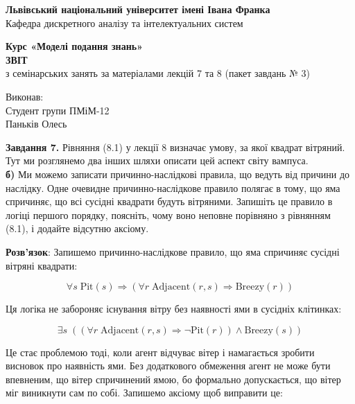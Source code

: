 \documentclass[a4paper,14pt]{extarticle} %
\begin{document}
\thispagestyle{empty}

\begin{center}
    \textbf{Львівський національний університет імені Івана Франка}\\[1ex]
    Кафедра дискретного аналізу та інтелектуальних систем
\end{center}

\vspace{5cm} %

\begin{center}
    \Large\textbf{Курс «Моделі подання знань»}\\[4ex]
    \huge\textbf{ЗВІТ}\\[3ex]
    \Large з семінарських занять за матеріалами лекцій 7 та 8 (пакет завдань № 3)
\end{center}

\vspace{2cm}
\begin{flushright}
    Виконав:\\
    Студент групи ПМіМ-12\\
    Паньків Олесь
\end{flushright}


\newpage
\pagestyle{plain}

\textbf{Завдання 7.} Рівняння (8.1) у лекції 8 визначає умову, за якої квадрат вітряний. Тут ми
розглянемо два інших шляхи описати цей аспект світу вампуса.\\
\textbf{б)} Ми можемо записати причинно-наслідкові правила, що ведуть від причини до наслідку.
Одне очевидне причинно-наслідкове правило полягає в тому, що яма спричиняє, що всі
сусідні квадрати будуть вітряними. Запишіть це правило в логіці першого порядку, поясніть,
чому воно неповне порівняно з рівнянням (8.1), і додайте відсутню аксіому.

\textbf{Розв'язок}: Запишемо причинно-наслідкове правило, що яма спричиняє
сусідні вітряні квадрати:

\[
    \forall s\; \text{Pit}(s) \Rightarrow \left( \forall r\; \text{Adjacent}(r, s) \Rightarrow \text{Breezy}(r) \right)
\]

Ця логіка не забороняє існування вітру без наявності ями в сусідніх клітинках:

\[
    \exists s\; \left( \left( \forall r\; \text{Adjacent}(r, s) \Rightarrow \neg\text{Pit}(r) \right) \land \text{Breezy}(s) \right)
\]

Це стає проблемою тоді, коли агент відчуває вітер і намагається зробити висновок про наявність ями.
Без додаткового обмеження агент не може бути впевненим, що вітер спричинений ямою, бо формально
допускається, що вітер міг виникнути сам по собі. Запишемо аксіому щоб виправити це:
\end{document}

